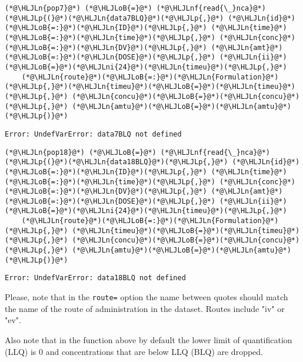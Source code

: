 \documentclass[12pt,a4paper]{article}
\newcommand{\HLJLn}[1]{#1}
\newcommand{\HLJLnf}[1]{\textcolor[RGB]{66,102,213}{#1}}
\newcommand{\HLJLni}[1]{\textcolor[RGB]{59,151,46}{#1}}
\newcommand{\HLJLoB}[1]{\textcolor[RGB]{102,102,102}{\textbf{#1}}}
\newcommand{\HLJLp}[1]{#1}
\begin{document}
\begin{lstlisting}
(*@\HLJLn{pop7}@*) (*@\HLJLoB{=}@*) (*@\HLJLnf{read{\_}nca}@*)(*@\HLJLp{(}@*)(*@\HLJLn{data7BLQ}@*)(*@\HLJLp{,}@*) (*@\HLJLn{id}@*)(*@\HLJLoB{=:}@*)(*@\HLJLn{ID}@*)(*@\HLJLp{,}@*) (*@\HLJLn{time}@*)(*@\HLJLoB{=:}@*)(*@\HLJLn{time}@*)(*@\HLJLp{,}@*) (*@\HLJLn{conc}@*)(*@\HLJLoB{=:}@*)(*@\HLJLn{DV}@*)(*@\HLJLp{,}@*) (*@\HLJLn{amt}@*)(*@\HLJLoB{=:}@*)(*@\HLJLn{DOSE}@*)(*@\HLJLp{,}@*) (*@\HLJLn{ii}@*)(*@\HLJLoB{=}@*)(*@\HLJLni{24}@*)(*@\HLJLn{timeu}@*)(*@\HLJLp{,}@*)
    (*@\HLJLn{route}@*)(*@\HLJLoB{=:}@*)(*@\HLJLn{Formulation}@*)(*@\HLJLp{,}@*)(*@\HLJLn{timeu}@*)(*@\HLJLoB{=}@*)(*@\HLJLn{timeu}@*)(*@\HLJLp{,}@*) (*@\HLJLn{concu}@*)(*@\HLJLoB{=}@*)(*@\HLJLn{concu}@*)(*@\HLJLp{,}@*) (*@\HLJLn{amtu}@*)(*@\HLJLoB{=}@*)(*@\HLJLn{amtu}@*)(*@\HLJLp{)}@*)
\end{lstlisting}

\begin{lstlisting}
Error: UndefVarError: data7BLQ not defined
\end{lstlisting}


\begin{lstlisting}
(*@\HLJLn{pop18}@*) (*@\HLJLoB{=}@*) (*@\HLJLnf{read{\_}nca}@*)(*@\HLJLp{(}@*)(*@\HLJLn{data18BLQ}@*)(*@\HLJLp{,}@*) (*@\HLJLn{id}@*)(*@\HLJLoB{=:}@*)(*@\HLJLn{ID}@*)(*@\HLJLp{,}@*) (*@\HLJLn{time}@*)(*@\HLJLoB{=:}@*)(*@\HLJLn{time}@*)(*@\HLJLp{,}@*) (*@\HLJLn{conc}@*)(*@\HLJLoB{=:}@*)(*@\HLJLn{DV}@*)(*@\HLJLp{,}@*) (*@\HLJLn{amt}@*)(*@\HLJLoB{=:}@*)(*@\HLJLn{DOSE}@*)(*@\HLJLp{,}@*) (*@\HLJLn{ii}@*)(*@\HLJLoB{=}@*)(*@\HLJLni{24}@*)(*@\HLJLn{timeu}@*)(*@\HLJLp{,}@*)
    (*@\HLJLn{route}@*)(*@\HLJLoB{=:}@*)(*@\HLJLn{Formulation}@*)(*@\HLJLp{,}@*) (*@\HLJLn{timeu}@*)(*@\HLJLoB{=}@*)(*@\HLJLn{timeu}@*)(*@\HLJLp{,}@*) (*@\HLJLn{concu}@*)(*@\HLJLoB{=}@*)(*@\HLJLn{concu}@*)(*@\HLJLp{,}@*) (*@\HLJLn{amtu}@*)(*@\HLJLoB{=}@*)(*@\HLJLn{amtu}@*)(*@\HLJLp{)}@*)
\end{lstlisting}

\begin{lstlisting}
Error: UndefVarError: data18BLQ not defined
\end{lstlisting}


Please, note that in the \texttt{route=} option the name between quotes should match the name of the route of administration in the dataset. Routes include "iv" or "ev".

Also note that in the function above by default the lower limit of quantification (LLQ) is 0 and concentrations that are below LLQ (BLQ) are dropped.
\end{document}

